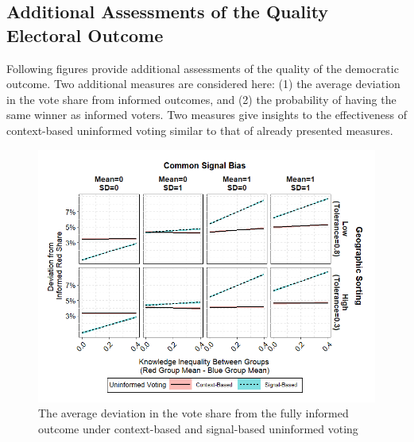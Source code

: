 \clearpage
\subsection{Additional Assessments of the Quality Electoral Outcome}

\par Following figures provide additional assessments of the quality of the democratic outcome. Two additional measures are considered here: (1) the average deviation in the vote share from informed outcomes, and (2) the probability of having the same winner as informed voters. Two measures give insights to the effectiveness of context-based uninformed voting similar to that of already presented measures. 

\begin{figure}[ht!!!]
    \caption{The average deviation in the vote share from the fully informed outcome under context-based and signal-based uninformed voting}
    \label{fig:abmres1}
    \includegraphics[width=\linewidth]{../outputs/abmres1.png}
\end{figure}

